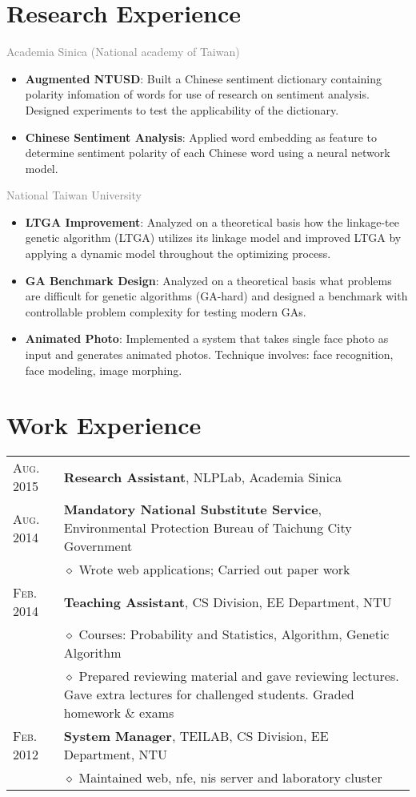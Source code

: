 \documentclass[a4paper,10pt]{article}
\begin{document}
\section{Research Experience}
\textcolor{gray}{Academia Sinica (National academy of Taiwan)}
\begin{itemize}
\item \textbf{Augmented NTUSD}: Built a Chinese sentiment dictionary containing polarity infomation of words for use of research on sentiment analysis. Designed experiments to test the applicability of the dictionary.
\item \textbf{Chinese Sentiment Analysis}: Applied word embedding as feature to determine sentiment polarity of each Chinese word using a neural network model.
\end{itemize}
\textcolor{gray}{National Taiwan University}
\begin{itemize}
\item \textbf{LTGA Improvement}: Analyzed on a theoretical basis how the linkage-tee genetic algorithm (LTGA) utilizes its linkage model and improved LTGA by applying a dynamic model throughout the optimizing process.
\item \textbf{GA Benchmark Design}: Analyzed on a theoretical basis what problems are difficult for genetic algorithms (GA-hard) and designed a benchmark with controllable problem complexity for testing modern GAs.
\item \textbf{Animated Photo}: Implemented a system that takes single face photo as input and generates animated photos. Technique involves: face recognition, face modeling, image morphing.
\end{itemize}
	


\section{Work Experience}
\begin{tabular}{l|p{15cm}}
 \textsc{Aug.} 2015 & \textbf{Research Assistant}, NLPLab, Academia Sinica\\
 \textsc{Aug.} 2014 & \textbf{Mandatory National Substitute Service}, Environmental Protection Bureau of Taichung City Government\\
                    & $\diamond$ Wrote web applications; Carried out paper work\\
 \textsc{Feb.} 2014 & \textbf{Teaching Assistant}, CS Division, EE Department, NTU\\
                    & $\diamond$ Courses: Probability and Statistics, Algorithm, Genetic Algorithm\\
                    & $\diamond$ Prepared reviewing material and gave reviewing lectures. Gave extra lectures for challenged students. Graded homework \& exams\\
\textsc{Feb.} 2012  & \textbf{System Manager}, TEILAB, CS Division, EE Department, NTU\\
                    & $\diamond$ Maintained web, nfe, nis server and laboratory cluster
\end{tabular}
\end{document}
